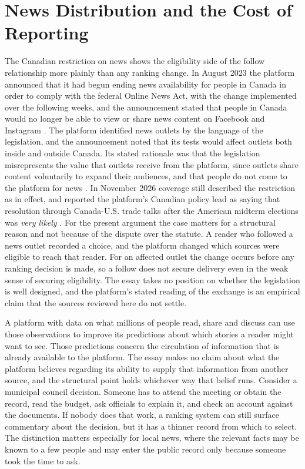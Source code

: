 \documentclass[11pt]{article}
\theoremstyle{definition}
\begin{document}
\section{News Distribution and the Cost of Reporting}

The Canadian restriction on news shows the eligibility side of the follow relationship more plainly than any ranking change. In August 2023 the platform announced that it had begun ending news availability for people in Canada in order to comply with the federal Online News Act, with the change implemented over the following weeks, and the announcement stated that people in Canada would no longer be able to view or share news content on Facebook and Instagram \cite{metacanadanews2023}. The platform identified news outlets by the language of the legislation, and the announcement noted that its tests would affect outlets both inside and outside Canada. Its stated rationale was that the legislation misrepresents the value that outlets receive from the platform, since outlets share content voluntarily to expand their audiences, and that people do not come to the platform for news \cite{metacanadanews2023}. In November 2026 coverage still described the restriction as in effect, and reported the platform's Canadian policy lead as saying that resolution through Canada-U.S. trade talks after the American midterm elections was \emph{very likely} \cite{dailyhive2026}. For the present argument the case matters for a structural reason and not because of the dispute over the statute. A reader who followed a news outlet recorded a choice, and the platform changed which sources were eligible to reach that reader. For an affected outlet the change occurs before any ranking decision is made, so a follow does not secure delivery even in the weak sense of securing eligibility. The essay takes no position on whether the legislation is well designed, and the platform's stated reading of the exchange is an empirical claim that the sources reviewed here do not settle.

A platform with data on what millions of people read, share and discuss can use those observations to improve its predictions about which stories a reader might want to see. Those predictions concern the circulation of information that is already available to the platform. The essay makes no claim about what the platform believes regarding its ability to supply that information from another source, and the structural point holds whichever way that belief runs. Consider a municipal council decision. Someone has to attend the meeting or obtain the record, read the budget, ask officials to explain it, and check an account against the documents. If nobody does that work, a ranking system can still surface commentary about the decision, but it has a thinner record from which to select. The distinction matters especially for local news, where the relevant facts may be known to a few people and may enter the public record only because someone took the time to ask.
\end{document}
